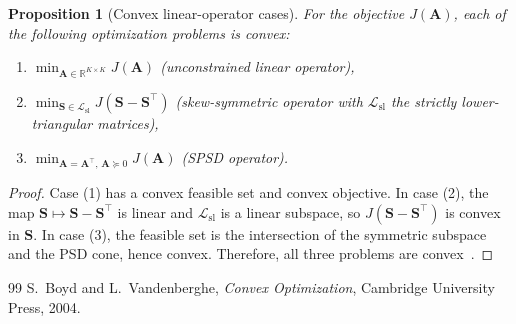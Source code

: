 \documentclass[10pt,a4paper]{amsart}
\newtheorem{proposition}{Proposition}
\newcommand{\RR}[1]{\mathbb{R}^{#1}}
\newcommand{\romDim}{K}
\begin{document}
\begin{proposition}[Convex linear-operator cases]
For the objective $J(\mathbf{A})$, each of the following optimization problems is convex:
\begin{enumerate}
    \item[(i)] $\min_{\mathbf{A}\in\RR{\romDim\times\romDim}} J(\mathbf{A})$ (unconstrained linear operator),
    \item[(ii)] $\min_{\mathbf{S}\in\mathcal{L}_{\mathrm{sl}}} J(\mathbf{S}-\mathbf{S}^{\intercal})$ (skew-symmetric operator with $\mathcal{L}_{\mathrm{sl}}$ the strictly lower-triangular matrices),
    \item[(iii)] $\min_{\mathbf{A}=\mathbf{A}^{\intercal},\,\mathbf{A}\succeq 0} J(\mathbf{A})$ (SPSD operator).
\end{enumerate}
\end{proposition}

\begin{proof}
Case (1) has a convex feasible set and convex objective. In case (2), the map $\mathbf{S}\mapsto \mathbf{S}-\mathbf{S}^{\intercal}$ is linear and $\mathcal{L}_{\mathrm{sl}}$ is a linear subspace, so $J(\mathbf{S}-\mathbf{S}^{\intercal})$ is convex in $\mathbf{S}$. In case (3), the feasible set is the intersection of the symmetric subspace and the PSD cone, hence convex. Therefore, all three problems are convex~\cite{BoydVandenberghe04}.
\end{proof}

\begin{thebibliography}{99}
 {\sc S.~Boyd and L.~Vandenberghe}, {\em {Convex} {Optimization}}, Cambridge University Press, 2004.
\end{thebibliography}
\end{document}
